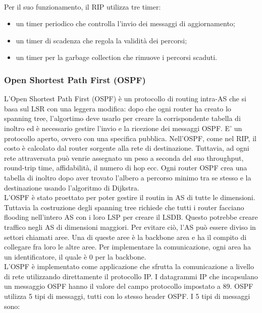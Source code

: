 \documentclass[12pt]{report}
\begin{document}
\vspace{\baselineskip}\\
Per il suo funzionamento, il RIP utilizza tre timer:
\begin{itemize}
	\item un timer periodico che controlla l'invio dei messaggi di aggiornamento;
	\item un timer di scadenza che regola la validità dei percorsi;
	\item un timer per la garbage collection che rimuove i percorsi scaduti.
\end{itemize}

\subsubsection{Open Shortest Path First (OSPF)}
L'Open Shortest Path First (OSPF) è un protocollo di routing intra-AS che si basa sul LSR con una leggera modifica: dopo che ogni router ha creato lo spanning tree, l'algortimo deve usarlo per creare la corrispondente tabella di inoltro ed è necessario gestire l'invio e la ricezione dei messaggi OSPF. E' un protocollo aperto, ovvero con una specifica pubblica. Nell'OSPF, come nel RIP, il costo è calcolato dal router sorgente alla rete di destinazione. Tuttavia, ad ogni rete attraversata può venrie assegnato un peso a seconda del suo throughput, round-trip time, affidabilità, il numero di hop ecc. Ogni router OSPF crea una tabella di inoltro dopo aver trovato l'albero a percorso minimo tra se stesso e la destinazione usando l'algoritmo di Dijkstra.
\vspace{\baselineskip}\\
L'OSPF è stato proettato per poter gestire il routin in AS di tutte le dimensioni. Tuttavia la costruzione degli spanning tree richiede che tutti i router facciano flooding nell'intero AS con i loro LSP per creare il LSDB. Questo potrebbe creare traffico negli AS di dimensioni maggiori. Per evitare ciò, l'AS può essere diviso in settori chiamati aree. Una di queste aree è la backbone area e ha il compito di collegare fra loro le altre aree. Per implementare la comunicazione, ogni area ha un identificatore, il quale è 0 per la backbone.
\vspace{\baselineskip}\\
L'OSPF è implementato come applicazione che sfrutta la comunicazione a livello di rete utilizzando direttamente il protocollo IP. I datagrammi IP che incapsulano un messaggio OSPF hanno il valore del campo protocollo impostato a 89. OSPF utilizza 5 tipi di messaggi, tutti con lo stesso header OSPF. I 5 tipi di messaggi sono:
\end{document}
